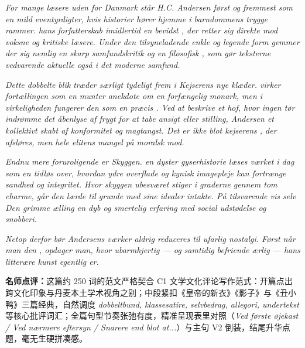 \begin{answerbox}
\textit{For mange læsere uden for Danmark står H.C. Andersen først og fremmest som en mild eventyrdigter, hvis historier hører hjemme i barndommens trygge rammer.  hans forfatterskab imidlertid en bevidst , der retter sig direkte mod voksne og kritiske læsere. Under den tilsyneladende enkle og legende form gemmer der sig nemlig en skarp samfundskritik og en filosofisk , som gør teksterne vedvarende aktuelle også i det moderne samfund.}

\textit{Dette dobbelte blik træder særligt tydeligt frem i \textit{Kejserens nye klæder}.  virker fortællingen som en munter anekdote om en forfængelig monark, men i virkeligheden fungerer den som en præcis . Ved at beskrive et hof, hvor ingen tør indrømme det åbenlyse af frygt for at tabe ansigt eller stilling,  Andersen et kollektivt  skabt af konformitet og magtangst. Det er ikke blot kejserens , der afsløres, men hele elitens mangel på moralsk mod.}

\textit{Endnu mere foruroligende er \textit{Skyggen}.  en dyster gyserhistorie læses værket i dag som en tidløs  over, hvordan ydre overflade og kynisk imagepleje kan fortrænge sandhed og integritet. Hvor skyggen ubesværet stiger i graderne gennem tom charme, går den lærde til grunde med sine idealer intakte. På tilsvarende vis  selv \textit{Den grimme ælling} en dyb og smertelig erfaring med social udstødelse og snobberi.}

\textit{Netop derfor bør Andersens værker aldrig reduceres til ufarlig nostalgi. Først når man  den  , opdager man, hvor ubarmhjertig --- og samtidig befriende ærlig --- hans litterære kunst egentlig er.}

\small\textbf{名师点评：}这篇约 250 词的范文严格契合 C1 文学文化评论写作范式：开篇点出跨文化印象与丹麦本土学术视角之别；中段紧扣《皇帝的新衣》《影子》与《丑小鸭》三篇经典，自然调度 \textit{dobbeltbund, klassesatire, selvbedrag, allegori, undertekst} 等核心批评词汇；全篇句型节奏张弛有度，精准呈现表里对照（\textit{Ved første øjekast / Ved nærmere eftersyn / Snarere end blot at...}）与主句 V2 倒装，结尾升华点题，毫无生硬拼凑感。
\end{answerbox}
